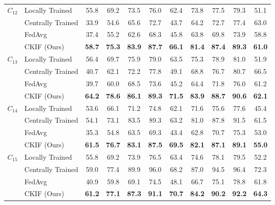 \begin{table}[t]
\begin{tabular}{llcccc|cccc|c}
    \midrule
    $C_{12}$ & Locally Trained   & 55.8 & 69.2 & 73.5 & 76.0 & 62.4 & 73.8 & 77.5 & 79.3 & 51.1  \\
                   & Centrally Trained & 33.9 & 54.6 & 65.6 & 72.7 & 43.7 & 64.2 & 72.7 & 77.4 & 63.0  \\
                   & FedAvg   & 37.4 & 55.2 & 62.6 & 68.3 & 45.8 & 63.8 & 69.8 & 73.9 & 58.8  \\
                   & CKIF (Ours)     & \textbf{58.7} & \textbf{75.3} & \textbf{83.9} & \textbf{87.7} & \textbf{66.1} & \textbf{81.4} & \textbf{87.4} & \textbf{89.3} & \textbf{61.0}   \\
    \midrule

    $C_{13}$ & Locally Trained   & 56.4 & 69.7 & 75.9 & 79.0 & 63.5 & 75.3 & 78.9 & 81.0 & 51.9  \\
                   & Centrally Trained & 40.7 & 62.1 & 72.2 & 77.8 & 49.1 & 68.8 & 76.7 & 80.7 & 66.5  \\
                   & FedAvg   & 39.7 & 60.0 & 68.5 & 73.6 & 45.2 & 64.4 & 71.8 & 76.0 & 61.2  \\
                   & CKIF (Ours)   & \textbf{64.2} & \textbf{78.6} & \textbf{86.1} & \textbf{89.3} & \textbf{71.5} & \textbf{83.9} & \textbf{88.7} & \textbf{90.6} & \textbf{62.1}   \\
    \midrule
    $C_{14}$ & Locally Trained   & 53.6 & 66.1 & 71.2 & 74.8 & 62.1 & 71.6 & 75.6 & 77.6 & 45.4  \\
                   & Centrally Trained & 54.1 & 73.1 & 83.5 & 89.3 & 63.2 & 81.0 & 87.8 & 91.5 & 61.5  \\
                   & FedAvg   & 35.3 & 54.8 & 63.5 & 69.3 & 43.4 & 62.8 & 70.7 & 75.3 & 53.0  \\
                   & CKIF (Ours)     & \textbf{61.5} & \textbf{76.7} & \textbf{83.1} & \textbf{87.5} & \textbf{69.5} & \textbf{82.1} & \textbf{87.1} & \textbf{89.1} & \textbf{55.0}   \\
    \midrule
    $C_{15}$ & Locally Trained   & 55.8 & 69.2 & 73.9 & 76.5 & 63.4 & 74.6 & 78.1 & 79.5 & 52.2  \\
                   & Centrally Trained & 59.0 & 77.4 & 89.9 & 96.0 & 68.2 & 87.0 & 94.5 & 96.4 & 72.3  \\
                   & FedAvg   & 40.9 & 59.8 & 69.1 & 74.5 & 48.1 & 66.7 & 75.1 & 78.8 & 61.8  \\
                   & CKIF (Ours)     & \textbf{61.2} & \textbf{77.1} & \textbf{87.3} & \textbf{91.1} & \textbf{70.7} & \textbf{84.2} & \textbf{90.2} & \textbf{92.2} & \textbf{64.3}   \\

\end{tabular}
\end{table}
